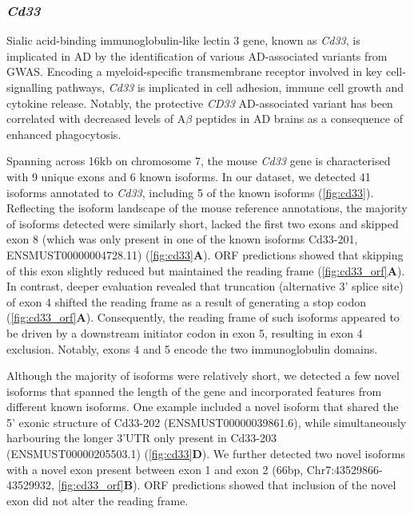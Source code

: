 \newpage
\subsubsection{\textit{Cd33}}
\label{ch5: cd33_annotation}
Sialic acid-binding immunoglobulin-like lectin 3 gene, known as \textit{Cd33}, is implicated in AD by the identification of various AD-associated variants from GWAS. Encoding a myeloid-specific transmembrane receptor involved in key cell-signalling pathways, \textit{Cd33} is implicated in cell adhesion, immune cell growth and cytokine release\cite{Griciuc2019}. Notably, the protective \textit{CD33} AD-associated variant has been correlated with decreased levels of A$\beta$ peptides in AD brains as a consequence of enhanced phagocytosis\cite{Bhattacherjee2021}. 

Spanning across 16kb on chromosome 7, the mouse \textit{Cd33} gene is characterised with 9 unique exons and 6 known isoforms. In our dataset, we detected 41 isoforms annotated to \textit{Cd33}, including 5 of the known isoforms (\cref{fig:cd33}). Reflecting the isoform landscape of the mouse reference annotations, the majority of isoforms detected were similarly short, lacked the first two exons and skipped exon 8 (which was only present in one of the known isoforms Cd33-201, ENSMUST00000004728.11) (\cref{fig:cd33}\textbf{A}). ORF predictions showed that skipping of this exon slightly reduced but maintained the reading frame (\cref{fig:cd33_orf}\textbf{A}). In contrast, deeper evaluation revealed that truncation (alternative 3' splice site) of exon 4 shifted the reading frame as a result of generating a stop codon (\cref{fig:cd33_orf}\textbf{A}). Consequently, the reading frame of such isoforms appeared to be driven by a downstream initiator codon in exon 5, resulting in exon 4 exclusion. Notably, exons 4 and 5 encode the two immunoglobulin domains.  

Although the majority of isoforms were relatively short, we detected a few novel isoforms that spanned the length of the gene and incorporated features from different known isoforms. One example included a novel isoform that shared the 5' exonic structure of Cd33-202 (ENSMUST00000039861.6), while simultaneously harbouring the longer 3'UTR only present in Cd33-203 (ENSMUST00000205503.1) (\cref{fig:cd33}\textbf{D}). We further detected two novel isoforms with a novel exon present between exon 1 and exon 2  (66bp, Chr7:43529866-43529932, \cref{fig:cd33_orf}\textbf{B}). ORF predictions showed that inclusion of the novel exon did not alter the reading frame. 


